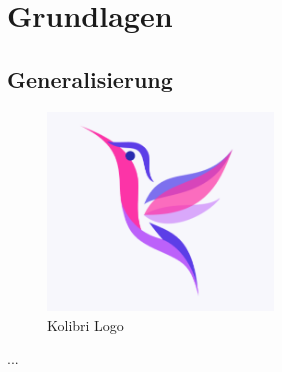 \chapter{Grundlagen}

\section{Generalisierung}

\begin{figure}[ht]
    \centering
    \includegraphics[width=60mm,scale=0.5]{img/kolibri-logo.png}
    \caption{Kolibri Logo}
    \label{Abbildung:Kolibri}
\end{figure}

...\cite{online}
